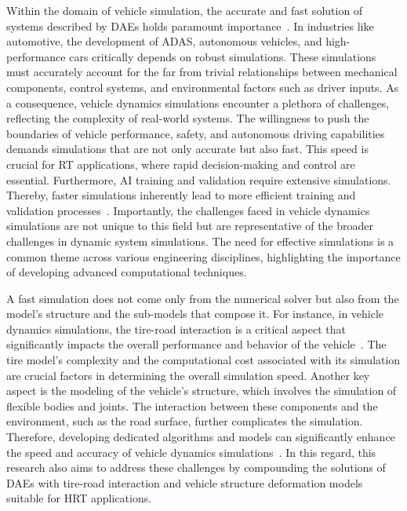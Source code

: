 Within the domain of vehicle simulation, the accurate and fast solution of systems described by \acp{DAE} holds paramount importance~\cite{burger2018dae,blundell2004multibody, dejalon1994kinematic, andreasson2016deployment, pankiewicz2003off}. In industries like automotive, the development of \ac{ADAS}, autonomous vehicles, and high-performance cars critically depends on robust simulations. These simulations must accurately account for the far from trivial relationships between mechanical components, control systems, and environmental factors such as driver inputs. As a consequence, vehicle dynamics simulations encounter a plethora of challenges, reflecting the complexity of real-world systems. The willingness to push the boundaries of vehicle performance, safety, and autonomous driving capabilities demands simulations that are not only accurate but also fast. This speed is crucial for \ac{RT} applications, where rapid decision-making and control are essential. Furthermore, \ac{AI} training and validation require extensive simulations. Thereby, faster simulations inherently lead to more efficient training and validation processes~\cite{piccinini2022predictive, piccinini2023physics}. Importantly, the challenges faced in vehicle dynamics simulations are not unique to this field but are representative of the broader challenges in dynamic system simulations. The need for effective simulations is a common theme across various engineering disciplines, highlighting the importance of developing advanced computational techniques.

A fast simulation does not come only from the numerical solver but also from the model's structure and the sub-models that compose it. For instance, in vehicle dynamics simulations, the tire-road interaction is a critical aspect that significantly impacts the overall performance and behavior of the vehicle~\cite{nakajima2019advanced}. The tire model's complexity and the computational cost associated with its simulation are crucial factors in determining the overall simulation speed. Another key aspect is the modeling of the vehicle's structure, which involves the simulation of flexible bodies and joints. The interaction between these components and the environment, such as the road surface, further complicates the simulation. Therefore, developing dedicated algorithms and models can significantly enhance the speed and accuracy of vehicle dynamics simulations~\cite{pankiewicz2003off}. In this regard, this research also aims to address these challenges by compounding the solutions of \acp{DAE} with tire-road interaction and vehicle structure deformation models suitable for \ac{HRT} applications.

